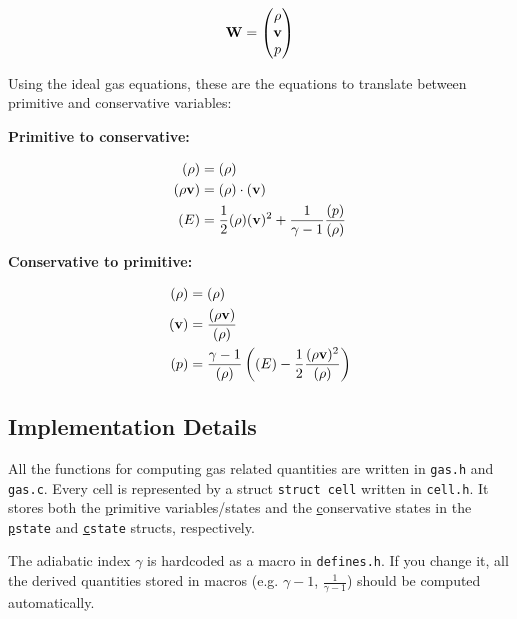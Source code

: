 \begin{align}
	\mathbf{W} = 
		\begin{pmatrix}
			\rho \\ \mathbf{v} \\ p
		\end{pmatrix}
\end{align}



Using the ideal gas equations, these are the equations to translate between primitive and conservative variables:

\textbf{Primitive to conservative:}

\begin{align}
	(\rho) &= (\rho) \\
	(\rho \mathbf{v}) &= (\rho) \cdot (\mathbf{v}) \\
	(E) &= \frac{1}{2} (\rho) (\mathbf{v})^2 + \frac{1}{\gamma - 1} \frac{(p)}{(\rho)}
\end{align}


\textbf{Conservative to primitive:}

\begin{align}
	(\rho) &= (\rho) \\
	(\mathbf{v}) &= \frac{(\rho \mathbf{v} )}{(\rho)}\\
	(p) &= \frac{\gamma - 1}{(\rho)}  \left((E) - \frac{1}{2} \frac{(\rho \mathbf{v})^2}{(\rho)} \right) 
\end{align}













\subsection{Implementation Details}

All the functions for computing gas related quantities are written in \verb|gas.h| and \verb|gas.c|.
Every cell is represented by a struct \verb|struct cell| written in \verb|cell.h|.
It stores both the \underline{p}rimitive variables/states and the \underline{c}onservative states in the \texttt{\underline{p}state} and \texttt{\underline{c}state} structs, respectively.

The adiabatic index $\gamma$ is hardcoded as a macro in \texttt{defines.h}.
If you change it, all the derived quantities stored in macros (e.g. $\gamma - 1$, $\frac{1}{\gamma - 1}$) should be computed automatically.

